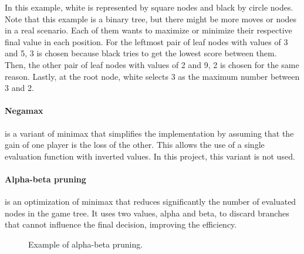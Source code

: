 \noindent In this example, white is represented by square nodes and black by circle nodes. Note that this example is a binary tree, but there might be more moves or nodes in a real scenario. Each of them wants to maximize or minimize their respective final value in each position. For the leftmost pair of leaf nodes with values of 3 and 5, 3 is chosen because black tries to get the lowest score between them. Then, the other pair of leaf nodes with values of 2 and 9, 2 is chosen for the same reason. Lastly, at the root node, white selects 3 as the maximum number between 3 and 2.

\paragraph{Negamax} is a variant of minimax that simplifies the implementation by assuming that the gain of one player is the loss of the other. This allows the use of a single evaluation function with inverted values. In this project, this variant is not used.

\paragraph{Alpha-beta pruning} is an optimization of minimax that reduces significantly the number of evaluated nodes in the game tree. It uses two values, alpha and beta, to discard branches that cannot influence the final decision, improving the efficiency.

\begin{figure}[H]
    \centering
    \caption{Example of alpha-beta pruning.}
    \label{fig:alpha-beta-pruning}
\end{figure}

